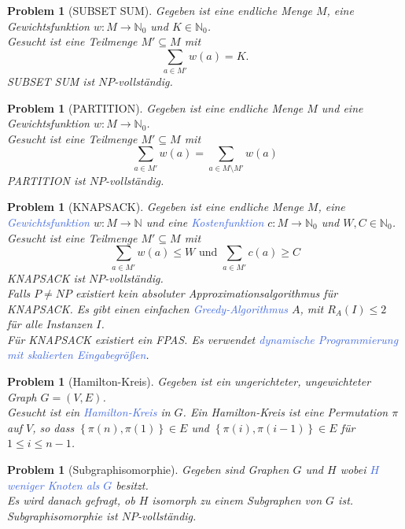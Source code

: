 \documentclass[11pt]{article}
\newcommand{\tcol}[1]{\textcolor{RoyalBlue}{#1}}
\newcommand{\set}[1]{\left\lbrace #1\right\rbrace}
\theoremstyle{break}
\newtheorem{prob}[satz]{Problem}
\begin{document}
    \begin{prob}[SUBSET SUM]
        Gegeben ist eine endliche Menge $M$, eine Gewichtsfunktion $w\colon M\to\mathbb{N}_0$ und $K\in\mathbb{N}_0$.\\
        Gesucht ist eine Teilmenge $M'\subseteq M$ mit
        \[\sum_{a\in M'}w(a)=K.\]
        SUBSET SUM ist $NP$-vollständig.
    \end{prob}

    \begin{prob}[PARTITION]
        Gegeben ist eine endliche Menge $M$ und eine Gewichtsfunktion $w\colon M\to\mathbb{N}
        _0$.\\
        Gesucht ist eine Teilmenge $M'\subseteq M$ mit
        \[\sum_{a\in M'}w(a)=\sum_{a\in M\setminus M'}w(a)\]
        PARTITION ist $NP$-vollständig.
    \end{prob}

    \begin{prob}[KNAPSACK]
        Gegeben ist eine endliche Menge $M$, eine \tcol{Gewichtsfunktion} $w\colon M\to\mathbb{N}$ und eine \tcol{Kostenfunktion} $c\colon M\to\mathbb{N}
        _0$ und $W,C\in\mathbb{N}_0$.\\
        Gesucht ist eine Teilmenge $M'\subseteq M$ mit
        \[\sum_{a\in M'}w(a)\leq W\text{ und }\sum_{a\in M'}c(a)\geq C\]
        KNAPSACK ist $NP$-vollständig.\\
        Falls $P\neq NP$ existiert kein absoluter Approximationsalgorithmus für KNAPSACK. Es gibt einen einfachen \tcol{Greedy-Algorithmus} $A$, mit $R_A(I)\leq 2$ für alle Instanzen $I$.\\
        Für KNAPSACK existiert ein FPAS. Es verwendet \tcol{dynamische Programmierung mit skalierten Eingabegrößen}.
    \end{prob}

    \begin{prob}[Hamilton-Kreis]
        Gegeben ist ein ungerichteter, ungewichteter Graph $G=(V,E)$.\\
        Gesucht ist ein \tcol{Hamilton-Kreis} in $G$.
        Ein Hamilton-Kreis ist eine Permutation $\pi$ auf $V$, so dass $\set{\pi(n),\pi(1)}\in E$ und $\set{\pi(i),\pi(i-1)}\in E$ für $1\leq i\leq n-1$.
    \end{prob}

    \begin{prob}[Subgraphisomorphie]
        Gegeben sind Graphen $G$ und $H$ wobei \tcol{$H$ weniger Knoten als $G$} besitzt.\\
        Es wird danach gefragt, ob $H$ isomorph zu einem Subgraphen von $G$ ist.\\
        Subgraphisomorphie ist $NP$-vollständig.
    \end{prob}
\end{document}
